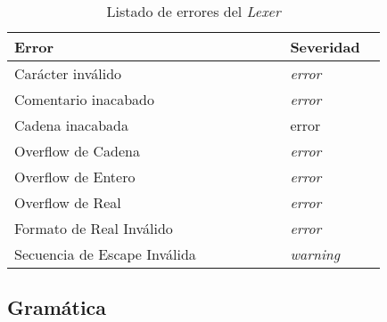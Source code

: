 \documentclass[a4paper]{CSMakotoTechnicalReport}
\begin{document}
\begin{multicols}{2}
    \renewcommand{\arraystretch}{1.5}
    \begin{table}[H]
        \caption{Listado de errores del \textit{Lexer}}
        \begin{tabular}{L{0.63\linewidth} L{0.20\linewidth}}
            \toprule
            \textbf{Error} & \textbf{Severidad} \\
            \midrule
            Carácter inválido & \textit{error} \\
            Comentario inacabado & \textit{error} \\
            Cadena inacabada & error \\
            Overflow de Cadena & \textit{error} \\
            Overflow de Entero & \textit{error} \\
            Overflow de Real & \textit{error} \\
            Formato de Real Inválido & \textit{error} \\
            Secuencia de Escape Inválida & \textit{warning} \\
            \bottomrule
        \end{tabular}
        \label{tab:example}
    \end{table}
\end{multicols}

    \subsection{Gramática}
\end{document}
